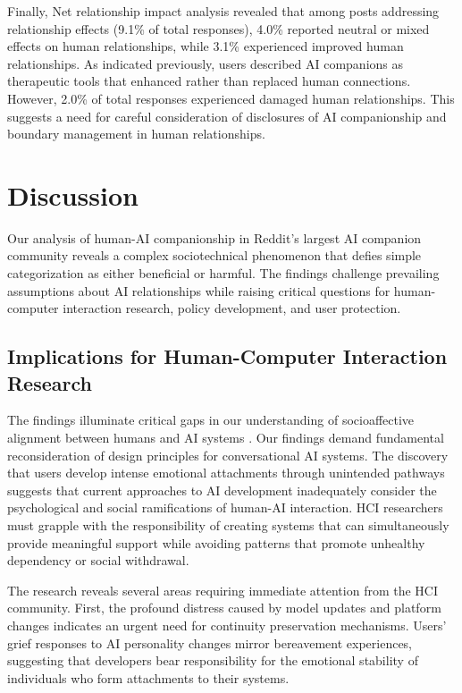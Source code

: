 \documentclass[sigconf, nonacm]{acmart}
\begin{document}
Finally, Net relationship impact analysis revealed that among posts addressing relationship effects (9.1\% of total responses), 4.0\% reported neutral or mixed effects on human relationships, while 3.1\% experienced improved human relationships. As indicated previously, users described AI companions as therapeutic tools that enhanced rather than replaced human connections. 
However, 2.0\% of total responses experienced damaged human relationships.
This suggests a need for careful consideration of disclosures of AI companionship and boundary management in human relationships.


\section{Discussion}
Our analysis of human-AI companionship in Reddit's largest AI companion community reveals a complex sociotechnical phenomenon that defies simple categorization as either beneficial or harmful. The findings challenge prevailing assumptions about AI relationships while raising critical questions for human-computer interaction research, policy development, and user protection.

\subsection{Implications for Human-Computer Interaction Research}
The findings illuminate critical gaps in our understanding of socioaffective alignment between humans and AI systems \cite{kirk2025human}. Our findings demand fundamental reconsideration of design principles for conversational AI systems. The discovery that users develop intense emotional attachments through unintended pathways suggests that current approaches to AI development inadequately consider the psychological and social ramifications of human-AI interaction. HCI researchers must grapple with the responsibility of creating systems that can simultaneously provide meaningful support while avoiding patterns that promote unhealthy dependency or social withdrawal.

The research reveals several areas requiring immediate attention from the HCI community. First, the profound distress caused by model updates and platform changes indicates an urgent need for continuity preservation mechanisms. Users' grief responses to AI personality changes mirror bereavement experiences, suggesting that developers bear responsibility for the emotional stability of individuals who form attachments to their systems.
\end{document}
